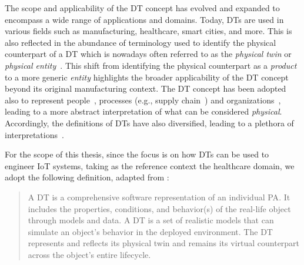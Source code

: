 
The scope and applicability of the \ac{DT} concept has evolved and expanded
to encompass a wide range of applications and domains.
%
Today, \acp{DT} are used in various fields such as manufacturing, healthcare, smart cities, and more.
%
This is also reflected in the abundance of terminology used to identify the physical counterpart of a \ac{DT}
which is nowadays often referred to as the \emph{physical twin} or
\emph{physical entity}~\cite{Singh_Fuenmayor_Hinchy_Qiao_Murray_Devine_2021,JONES202036,DBLP:journals/jss/DaliborJRSWWW22}.
%
This shift from identifying the physical counterpart as a \emph{product} to a more generic \emph{entity}
highlights the broader applicability of the \ac{DT} concept beyond its original manufacturing context.
%
The \ac{DT} concept has been adopted also to represent people~\cite{Shengli_2021},
processes (e.g., supply chain~\cite{Barykin_Bochkarev_Kalinina_Yadykin_2020}) and organizations~\cite{Parmar_Leiponen_Thomas_2020}, leading to a more abstract interpretation of what can be considered \emph{physical}. 
%
Accordingly, the definitions of \acp{DT} have also diversified, leading to a plethora of interpretations~\cite{DBLP:journals/jss/DaliborJRSWWW22}. 

For the scope of this thesis, 
since the focus is on how \acp{DT} can be used to engineer \ac{IoT} systems, taking as the reference context the healthcare domain,
we adopt the following definition, adapted from \cite{dt-IoT-context-Minerva-2020}:

\begin{quote}
A \acl{DT} is a comprehensive software representation of an individual \acl{PA}.
It includes the properties, conditions, and behavior(s) of the real-life object through models and data.
A \acl{DT} is a set of realistic models that can simulate an object's behavior in the deployed environment.
The DT represents and reflects its physical twin and remains its virtual counterpart across the object's entire lifecycle.
\end{quote}

